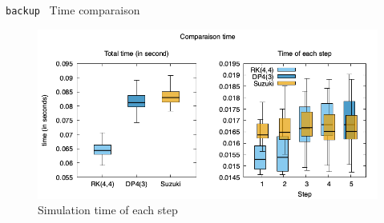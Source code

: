 \documentclass{beamer}
\newcommand{\backupend}{
  \setcounter{framenumber}{\value{finalframe}}
}
\newenvironment{bframe}[1]%
{%
  \begin{frame}{{\small\texttt{backup}\ } #1}
}%
{%
  \end{frame}
}
\begin{document}
\begin{bframe}{Time comparaison}
  \begin{figure}
    \includegraphics[width=\textwidth]{img/timer_boxplot_t4}
    \caption{Simulation time of each step}
  \end{figure}
\end{bframe}

\backupend
\end{document}
